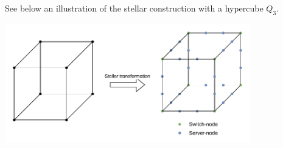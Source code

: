 \begin{solution}
  See below an illustration of the stellar construction with a hypercube $Q_3$.
  \begin{center}
    \includegraphics[width=0.8\textwidth]{q14.pdf}
  \end{center}
\end{solution}
